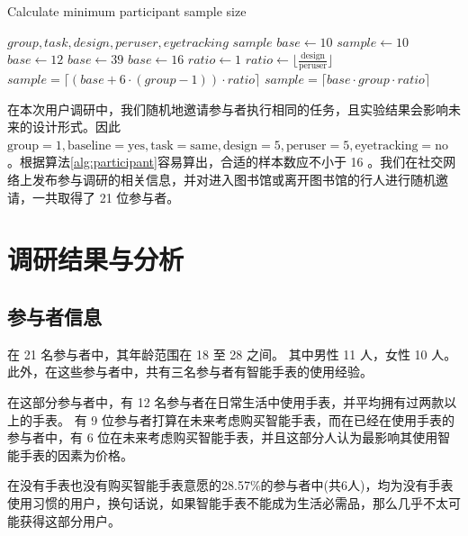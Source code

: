 \begin{algorithm}[H]
\caption{Calculate minimum participant sample size}
\label{alg:participant}
\begin{algorithmic}
\REQUIRE $group, task, design, peruser, eyetracking$
\ENSURE $sample$
\STATE $base \leftarrow 10$
\STATE $sample \leftarrow 10$
\STATE $base \leftarrow 12$
\STATE $base \leftarrow 39$
\ENDIF
{}
\STATE $base \leftarrow 16$
\ENDIF
{}
\STATE $ratio \leftarrow 1$
\ELSE
\STATE $ratio \leftarrow \lfloor\frac{\text{design}}{\text{peruser}}\rfloor$
\ENDIF
{}
    \STATE $sample = \lceil (base + 6 \cdot (group - 1)) \cdot ratio \rceil$
\ELSE
    \STATE $sample = \lceil base \cdot group \cdot ratio \rceil$
\ENDIF
\end{algorithmic}
\end{algorithm}

在本次用户调研中，我们随机地邀请参与者执行相同的任务，且实验结果会影响未来的设计形式。因此 $\text{group}=1, \text{baseline}=\text{yes}, \text{task}=\text{same}, \text{design}=5, \text{peruser}=5, \text{eyetracking}=\text{no}$ 。根据算法\ref{alg:participant}容易算出，合适的样本数应不小于 16 。我们在社交网络上发布参与调研的相关信息，并对进入图书馆或离开图书馆的行人进行随机邀请，一共取得了 21 位参与者。

\section{调研结果与分析}

\subsection{参与者信息}

在 21 名参与者中，其年龄范围在 18 至 28 之间。%
其中男性 11 人，女性 10 人。此外，在这些参与者中，共有三名参与者有智能手表的使用经验。

在这部分参与者中，有 12 名参与者在日常生活中使用手表，并平均拥有过两款以上的手表。
有 9 位参与者打算在未来考虑购买智能手表，而在已经在使用手表的参与者中，有 6 位在未来考虑购买智能手表，并且这部分人认为最影响其使用智能手表的因素为价格。

在没有手表也没有购买智能手表意愿的28.57\%的参与者中(共6人)，均为没有手表使用习惯的用户，换句话说，如果智能手表不能成为生活必需品，那么几乎不太可能获得这部分用户。


